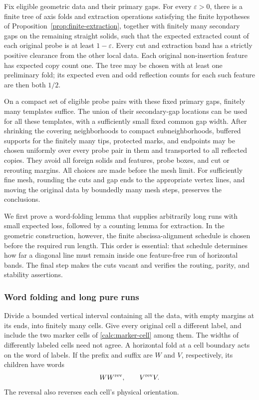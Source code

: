 \begin{lemma}
\label{lem:reflection-templates}
Fix eligible geometric data and their primary gaps. For every
$\varepsilon>0$, there is a finite tree of axis folds and
extraction operations satisfying the finite hypotheses of
Proposition~\ref{prop:finite-extraction}, together
with finitely many secondary gaps on the remaining straight solids,
such that the expected extracted count of each original probe is at
least $1-\varepsilon$. Every cut and extraction band has a strictly
positive clearance from the other local data. Each original
non-insertion feature has expected copy count one. The tree may be
chosen with at least one preliminary fold; its expected even and
odd reflection counts for each such feature are then both $1/2$.

On a compact set of eligible probe pairs with these fixed primary
gaps, finitely many templates suffice. The union of their
secondary-gap locations can be used for
all these templates, with a sufficiently small fixed common gap
width.  After shrinking the covering neighborhoods to compact
subneighborhoods, buffered supports for the finitely many tips,
protected marks, and endpoints may be chosen uniformly over every
probe pair in them and transported to all reflected copies.  They
avoid all foreign solids and features, probe boxes, and cut or
rerouting margins.  All choices are made before the mesh limit.
For sufficiently
fine mesh, rounding the cuts and gap ends to the appropriate vertex
lines, and moving the original data by boundedly many mesh steps,
preserves the conclusions.
\end{lemma}

We first prove a word-folding lemma that supplies arbitrarily long
runs with small expected loss, followed by a counting lemma for
extraction. In the geometric construction, however, the finite
abscissa-alignment schedule is chosen before the required run length.
This order is essential: that schedule determines how far a diagonal
line must remain inside one feature-free run of horizontal bands.
The final step makes the cuts vacant and verifies the routing, parity,
and stability assertions.

\subsubsection{Word folding and long pure runs}

Divide a bounded vertical interval containing all the data, with
empty margins at its ends, into finitely many cells. Give every
original cell a different label, and include the two marker cells
of \eqref{calc:marker-cell} among them. The widths of differently
labeled cells need not agree. A horizontal fold at a cell boundary
acts on the word of labels. If the prefix and suffix are $W$ and
$V$, respectively, its children have words
\begin{equation}
 WW^{\rm rev},\qquad V^{\rm rev}V.
 \label{calc:word-fold}
\end{equation}
The reversal also reverses each cell's physical orientation.

